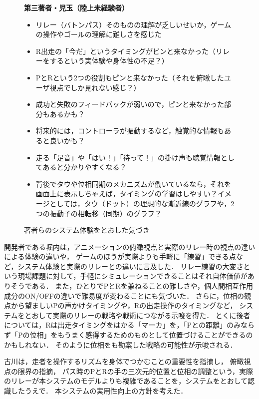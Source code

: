 \documentclass{jsai2e}
\newif\ifshowlabels
\newcommand{\tagtext}[3]{%
  \ifshowlabels
    \textcolor{#1}{#3\textsuperscript{\textsf{[#2]}}}%
  \else
    #3%
  \fi
}
\newcommand{\fix}[2]{\tagtext{fixred}{#1}{#2}}
\begin{document}
\begin{figure}[t]
{\begin{minipage}{0.95\columnwidth}
\textbf{第三著者・児玉（陸上未経験者）}
\begin{itemize}\setlength{\itemsep}{0pt}
\item リレー（バトンパス）そのものの理解が乏しいせいか，ゲームの操作やゴールの理解に難しさを感じた
\item R出走の「今だ」というタイミングがピンと来なかった（リレーをするという実体験や身体性の不足？）
\item PとRという2つの役割もピンと来なかった（それを俯瞰したユーザ視点でしか見れない感じ？）
\item 成功と失敗のフィードバックが弱いので，ピンと来なかった部分もあるかも？
\item 将来的には，コントローラが振動するなど，触覚的な情報もあると良いかも？
\item 走る「足音」や「はい！」「待って！」の掛け声も聴覚情報としてあると分かりやすくなる？
\item 背後でタウや位相同期のメカニズムが働いているなら，それを画面上に表示しちゃえば，タイミングの学習はしやすい？イメージとしては，タウ（ドット）の理想的な漸近線のグラフや，2つの振動子の相転移（同期）のグラフ？
\end{itemize}

\end{minipage}
}
\caption{著者らのシステム体験をとおした気づき}
\label{fig:comments_authors}
\end{figure}

\fix{}
{開発者である堀内は，アニメーションの俯瞰視点と実際のリレー時の視点の違いによる体験の違いや，
ゲームのほうが実際よりも手軽に「練習」できる点など，システム体験と実際のリレーとの違いに言及した．
リレー練習の大変さという現場課題に対して，手軽にシミュレーションできることはそれ自体価値がありそうである．
また，ひとりでPとRを兼ねることの難しさや，個人間相互作用成分のON/OFFの違いで難易度が変わることにも気づいた．
さらに，位相の観点から望ましいPの声かけタイミングや，Rの出走操作のタイミングなど，
システムをとおして実際のリレーの戦略や戦術につながる示唆を得た．
とくに後者については，Rは出走タイミングをはかる「マーカ」を，「Pとの距離」のみならず「Pの位相」をもうまく感得するためのものとして位置づけることができるのかもしれない．
そのように位相をも勘案した戦略の可能性が示唆される．
}

\fix{}{
古川は，走者を操作するリズムを身体でつかむことの重要性を指摘し，
俯瞰視点の限界の指摘，
パス時のPとRの手の三次元的位置と位相の調整という，実際のリレーが本システムのモデルよりも複雑であることを，システムをとおして認識したうえで．
本システムの実用性向上の方針を考えた．
}
\end{document}
